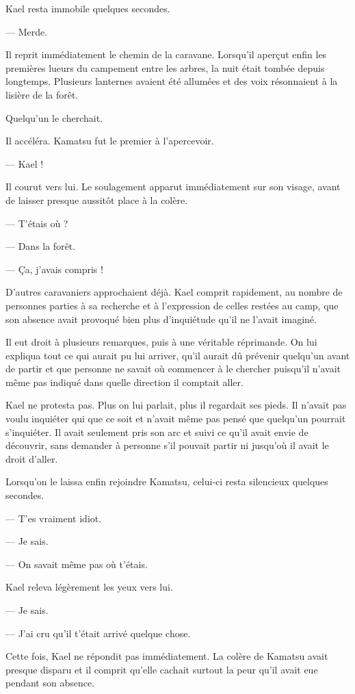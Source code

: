 Kael resta immobile quelques secondes.

— Merde.

Il reprit immédiatement le chemin de la caravane. Lorsqu'il aperçut enfin les
premières lueurs du campement entre les arbres, la nuit était tombée depuis
longtemps. Plusieurs lanternes avaient été allumées et des voix résonnaient à
la lisière de la forêt.

Quelqu'un le cherchait.

Il accéléra. Kamatsu fut le premier à l'apercevoir.

— Kael !

Il courut vers lui. Le soulagement apparut immédiatement sur son visage, avant
de laisser presque aussitôt place à la colère.

— T'étais où ?

— Dans la forêt.

— Ça, j'avais compris !

D'autres caravaniers approchaient déjà. Kael comprit rapidement, au nombre de
personnes parties à sa recherche et à l'expression de celles restées au camp,
que son absence avait provoqué bien plus d'inquiétude qu'il ne l'avait imaginé.

Il eut droit à plusieurs remarques, puis à une véritable réprimande. On lui
expliqua tout ce qui aurait pu lui arriver, qu'il aurait dû prévenir quelqu'un
avant de partir et que personne ne savait où commencer à le chercher puisqu'il
n'avait même pas indiqué dans quelle direction il comptait aller.

Kael ne protesta pas. Plus on lui parlait, plus il regardait ses pieds. Il
n'avait pas voulu inquiéter qui que ce soit et n'avait même pas pensé que
quelqu'un pourrait s'inquiéter. Il avait seulement pris son arc et suivi ce
qu'il avait envie de découvrir, sans demander à personne s'il pouvait partir ni
jusqu'où il avait le droit d'aller.

Lorsqu'on le laissa enfin rejoindre Kamatsu, celui-ci resta silencieux quelques
secondes.

— T'es vraiment idiot.

— Je sais.

— On savait même pas où t'étais.

Kael releva légèrement les yeux vers lui.

— Je sais.

— J'ai cru qu'il t'était arrivé quelque chose.

Cette fois, Kael ne répondit pas immédiatement. La colère de Kamatsu avait
presque disparu et il comprit qu'elle cachait surtout la peur qu'il avait eue
pendant son absence.

